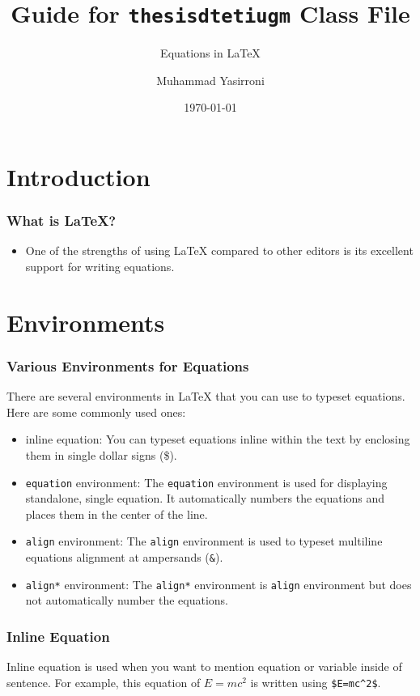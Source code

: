 \documentclass{beamer}
\title{Guide for \texttt{thesisdtetiugm} Class File}
\subtitle{Equations in LaTeX}
\author{Muhammad Yasirroni}
\institute{Universitas Gadjah Mada}
\date{\today}
\begin{document}
\begin{frame}
  \titlepage
\end{frame}

\section{Introduction}
\begin{frame}
  \frametitle{What is LaTeX?}
  \begin{itemize}
    \item One of the strengths of using LaTeX compared to other editors is its excellent support for writing equations.
  \end{itemize}
\end{frame}

\section{Environments}
\begin{frame}[fragile]
  \frametitle{Various Environments for Equations}
  There are several environments in LaTeX that you can use to typeset equations. Here are some commonly used ones:

  \begin{itemize}
    \item inline equation: You can typeset equations inline within the text by enclosing them in single dollar signs (\$).

    \item \texttt{equation} environment: The \texttt{equation} environment is used for displaying standalone, single equation. It automatically numbers the equations and places them in the center of the line.

    \item \texttt{align} environment: The \texttt{align} environment is used to typeset multiline equations alignment at ampersands (\verb|&|).

    \item \texttt{align*} environment: The \texttt{align*} environment is \texttt{align} environment but does not automatically number the equations.

  \end{itemize}
\end{frame}

\begin{frame}[fragile]
  \frametitle{Inline Equation}
  Inline equation is used when you want to mention equation or variable inside of sentence. For example, this equation of $E=mc^2$ is written using \verb|$E=mc^2$|. 
\end{frame}
\end{document}
